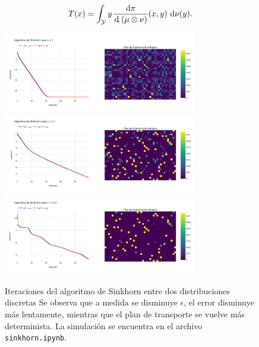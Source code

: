 \begin{equation*}
	T(x) = \int_{\mathcal{Y}} y \frac{\,\operatorname{d}\!\pi}{\,\operatorname{d}\!,(\mu\otimes\nu)}(x,y) \,\operatorname{d}\!\nu(y).
\end{equation*}

\begin{figure}[!ht]
	\centering
	\includegraphics[width=0.75\textwidth]{images/eot_sbp/discrete_sinkhorn_matrix1}
	\includegraphics[width=0.75\textwidth]{images/eot_sbp/discrete_sinkhorn_matrix0.1}
	\includegraphics[width=0.75\textwidth]{images/eot_sbp/discrete_sinkhorn_matrix0.01}
	\caption{Iteraciones del algoritmo de Sinkhorn entre dos distribuciones discretas Se observa que a medida se disminuye $\epsilon$, el error disminuye más lentamente, mientras que el plan de transporte se vuelve más determinista. La simulación se encuentra en el archivo \texttt{sinkhorn.ipynb}.}
	\label{fig:eot_sbp/discrete_sinkhorn_matrix}
\end{figure}

